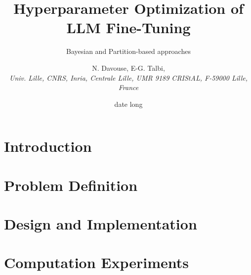 \documentclass[A4,svgnames,9pt,aspectratio=169]{beamer}
\title[titrecourt]{Hyperparameter Optimization of \\ LLM Fine-Tuning}
\subtitle{Bayesian and Partition-based approaches}
\date[20/01/2025]{date long}
\author[A. et al.]{N. Davouse, E-G. Talbi,\\ \textit{Univ. Lille, CNRS, Inria, Centrale Lille, UMR 9189 CRIStAL, F-59000 Lille, France} }
\begin{document}

\frame{\titlepage}

\renewcommand{\thempfootnote}{\arabic{mpfootnote}}
\renewcommand{\contentsname}{Summary}



\frame{\tocpage}

\section{Introduction}
\frame{\sectionpage}


% 

\section{Problem Definition}
\frame{\sectionpage}


\section{Design and Implementation}
\frame{\sectionpage}


\section{Computation Experiments}
\frame{\sectionpage}

\end{document}
